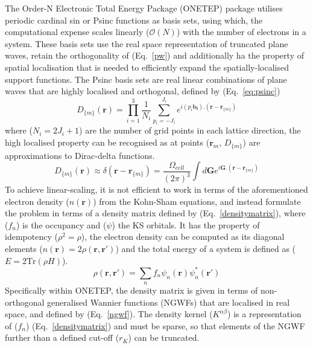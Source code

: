 The Order-N Electronic Total Energy Package (ONETEP) package \cite{onetep1, onetep2} utilises periodic cardinal sin or Psinc functions as basis sets, \cite{psinc} using which, the computational expense scales linearly ($\mathcal{O}(N)$) with the number of electrons in a system. These basis sets use the real space representation of truncated plane waves,  retain the orthogonality of (Eq.~\ref{pw}) and additionally ha the property of spatial localisation that is needed to efficiently expand the spatially-localised support functions. The Psinc basis sets are real linear combinations of plane waves that are highly localised and orthogonal, defined by (Eq.~\ref{eq:psinc})
\begin{equation}\label{eq:psinc}
D_{\{m\}} \mathbf{(r)} = \prod_{i=1}^3 \frac{1}{N_i} \sum_{p_i = - J_i}^{J_i} e^{i (p_i \mathbf{b_i}).(\mathbf{r - r}_{\{m\}})}
\end{equation}
%
where ($N_i = 2J_i +1$) are the number of grid points in each lattice direction, the high localised property can be recognised as at points ($\mathbf{r}_m$, $D_{\{m\}}$) are approximations to Dirac-delta functions.
%
\begin{equation}
D_{\{m\}} \mathbf{(r)} \approx \delta ( \mathbf{r - r}_{\{m\}}) = \frac{\Omega_{cell}}{(2 \pi)^3} \int d \mathbf{G} e^{i \mathbf{G}.(\mathbf{r - r}_{\{m\}})}
\end{equation}
%
%
To achieve linear-scaling, it is not efficient to work in terms of the aforementioned electron density ($n(\mathbf{r})$) from the Kohn-Sham equations, and instead formulate the problem in terms of a density matrix defined by (Eq.~\ref{densitymatrix}), where ($f_n$) is the occupancy and ($\psi$) the KS orbitals. It has the property of idempotency ($\rho^2 = \rho$), the electron density can be computed as its diagonal elements ($n(\mathbf{r}) = 2 \rho(\mathbf{r, r'})$) and the total energy of a system is defined as ($E = 2\mathrm{Tr} (\rho H)$).
%
\begin{equation} \label{densitymatrix}
\rho(\mathbf{r, r'}) = \sum_n f_n \psi_n(\mathbf{r}) \psi_n^*(\mathbf{r'})
\end{equation} 
%
Specifically within ONETEP, the density matrix is given in terms of non-orthogonal generalised Wannier functions (NGWFs) that are localised in real space,\cite{psinc} and defined by (Eq.~\ref{ngwf}). The density kernel ($K^{\alpha \beta}$) is a representation of ($f_n$) (Eq.~\ref{densitymatrix}) and must be sparse, so that elements of the NGWF further than a defined cut-off ($r_K$) can be truncated.
